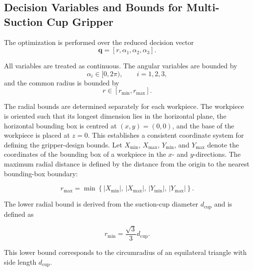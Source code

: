 \subsection{Decision Variables and Bounds for Multi-Suction Cup Gripper}

The optimization is performed over the reduced decision vector
\begin{equation}
    \mathbf{q} = [r,\alpha_1,\alpha_2,\alpha_3].
\end{equation}

All variables are treated as continuous. The angular variables are bounded by
\begin{equation}
    \alpha_i \in [0,2\pi), \qquad i=1,2,3,
\end{equation}
and the common radius is bounded by
\begin{equation}
    r \in [r_{\min},r_{\max}].
\end{equation}

The radial bounds are determined separately for each workpiece. The workpiece is oriented such that its longest dimension lies in the horizontal
plane, the horizontal bounding box is centred at \((x,y)=(0,0)\), and the base of the workpiece is placed at \(z=0\). This establishes a consistent
coordinate system for defining the gripper-design bounds. Let \(X_{\min}\), \(X_{\max}\), \(Y_{\min}\), and \(Y_{\max}\) denote the coordinates of the
bounding box of a workpiece in the \(x\)- and \(y\)-directions. The maximum radial distance is defined by the distance from the origin to the nearest
bounding-box boundary:

\begin{equation}
    r_{\max}
    =
    \min
    \left\{
        |X_{\min}|,\,
        |X_{\max}|,\,
        |Y_{\min}|,\,
        |Y_{\max}|
    \right\}.
\end{equation}


The lower radial bound is derived from the suction-cup diameter
\(d_{\mathrm{cup}}\) and is defined as

\begin{equation}
    r_{\min}
    =
    \frac{\sqrt{3}}{3}
    d_{\mathrm{cup}}.
\end{equation}

This lower bound corresponds to the circumradius of an equilateral triangle with side length \(d_{\mathrm{cup}}\).

